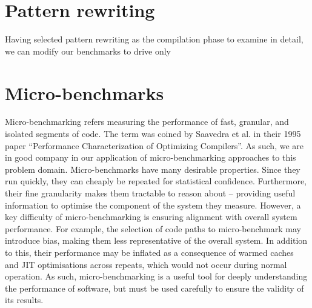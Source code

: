 \section{Pattern rewriting}

Having selected pattern rewriting as the compilation phase to examine in detail, we can modify our benchmarks to drive only 











\section{Micro-benchmarks}
\label{sec:ubenchmark}

Micro-benchmarking refers measuring the performance of fast, granular, and isolated segments of code.
The term was coined by Saavedra et al. in their 1995 paper \cite{saavedraPerformanceCharacterizationOptimizing1995} ``Performance Characterization of Optimizing Compilers''. As such, we are in good company in our application of micro-benchmarking approaches to this problem domain.
Micro-benchmarks have many desirable properties. Since they run quickly, they can cheaply be repeated for statistical confidence.
Furthermore, their fine granularity makes them tractable to reason about -- providing useful information to optimise the component of the system they measure.
However, a key difficulty of micro-benchmarking is ensuring alignment with overall system performance. For example, the selection of code paths to micro-benchmark may introduce bias, making them less representative of the overall system. In addition to this, their performance may be inflated as a consequence of warmed caches and JIT optimisations across repeats, which would not occur during normal operation.
As such, micro-benchmarking is a useful tool for deeply understanding the performance of software, but must be used carefully to ensure the validity of its results.

